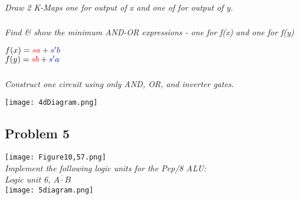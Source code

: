 \documentclass[a4paper,man,natbib]{apa6}
\begin{document}
\subsubsection{} 
\emph{Draw 2 K-Maps one for output of x and one of for output of y.} \\
\begin{center}

\begin{minipage}{2in}
\end{minipage}	
\begin{minipage}{2in}
\end{minipage}
\end{center}

\subsubsection{}
\emph{Find \& show the minimum AND-OR expressions - one for f(x) and one for f(y)} \\

\begin{center}
	$f(x)=\textcolor{red}{sa}+\textcolor{blue}{s'b}$ \\
	$f(y)=\textcolor{red}{sb}+\textcolor{blue}{s'a}$ \\
\end{center}

\subsubsection{}
\emph{Construct one circuit using only AND, OR, and inverter gates.} \\

\begin{center}
	\texttt{[image: 4dDiagram.png]}
\end{center}

\subsection{Problem 5}
\doublespacing
\texttt{[image: Figure10,57.png]} \\
\emph{Implement the following logic units for the Pep/8 ALU: \\
Logic unit 6, $ \overline{ A \cdot B } $} \\
\texttt{[image: 5diagram.png]}

\nocite{warford10}


\end{document}
